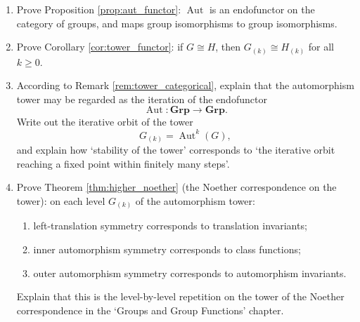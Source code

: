 \begin{enumerate}[leftmargin=3em, label=\textbf{Exercise \arabic*}]
    \item Prove Proposition \ref{prop:aut_functor}:
    $\operatorname{Aut}$ is an endofunctor on the category of groups, and maps group isomorphisms to group isomorphisms.

    \item Prove Corollary \ref{cor:tower_functor}:
    if $G\cong H$, then $G_{(k)}\cong H_{(k)}$ for all $k\ge 0$.

    \item According to Remark \ref{rem:tower_categorical},
    explain that the automorphism tower may be regarded as the iteration of the endofunctor
    \[
    \operatorname{Aut}:\mathbf{Grp}\to\mathbf{Grp}.
    \]
    Write out the iterative orbit of the tower
    \[
    G_{(k)}=\operatorname{Aut}^k(G),
    \]
    and explain how `stability of the tower' corresponds to `the iterative orbit reaching a fixed point within finitely many steps'.

    \item Prove Theorem \ref{thm:higher_noether} (the Noether correspondence on the tower):
    on each level $G_{(k)}$ of the automorphism tower:
    \begin{enumerate}[label=(\roman*)]
        \item left-translation symmetry corresponds to translation invariants;
        \item inner automorphism symmetry corresponds to class functions;
        \item outer automorphism symmetry corresponds to automorphism invariants.
    \end{enumerate}
    Explain that this is the level-by-level repetition on the tower of the Noether correspondence in the `Groups and Group Functions' chapter.


\end{enumerate}
